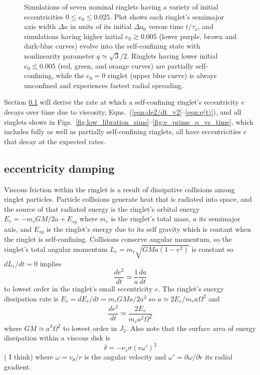\documentclass[preprint]{aastex62}
\begin{document}
\begin{figure}
    \caption{
        \label{fig:e0}
        Simulations of seven nominal ringlets having a variety of initial eccentricities $0\le e_0\le 0.025$.
        Plot shows each ringlet's semimajor axis width $\Delta a$ in units of its initial $\Delta a_0$
        versus time $t/\tau_\nu$, and simulations having higher initial $e_0\gtrsim0.005$ 
        (lower purple, brown and dark-blue curves) evolve into the self-confining state
        with nonlinearity parameter $q\simeq\sqrt{3}/2$. Ringlets having lower initial $e_0\lesssim0.005$
        (red, green, and orange curves) are partially self-confining, while the $e_0=0$ ringlet (upper blue curve)
        is always unconfined and experiences fastest radial spreading.
    }
\end{figure}

Section \ref{subsec:eccentricity} will derive the rate at which
a self-confining ringlet's eccentricity $e$ decays over time due to viscosity, Eqns.\ (\ref{eqn:de2/dt_v2}--\ref{eqn:e(t)}),
and all ringlets shows in Figs.\ \ref{fig:low_libration_sims}--\ref{fig:e_prime_q_vs_time},
which includes fully as well as partially self-confining ringlets, all have eccentricities $e$
that decay at the expected rates.


\subsection{eccentricity damping}
\label{subsec:eccentricity}

Viscous friction within the ringlet is a result of dissipative collisions among ringlet particles.
Particle collisions generate heat that is radiated into space, and the source of that radiated energy
is the ringlet's orbital energy $E_r=-m_rGM/2a + E_{sg}$ where $m_r$ is the ringlet's total
mass, $a$ its semimajor axis, and $E_{sg}$ is the ringlet's energy due to its self gravity
which is contant when the ringlet is self-confining. 
Collisions conserve angular momentum, so the ringlet's total angular momentum
$L_r=m_r\sqrt{GMa(1-e^2)}$ is constant so $dL_r/dt=0$ implies
\begin{equation}
    \label{eqn:e2-dot}
    \frac{de^2}{dt} \simeq \frac{1}{a}\frac{da}{dt}
\end{equation}
to lowest order in the ringlet's small eccentricity $e$.
The ringlet's energy dissipation rate is $\dot{E}_r = dE_r/dt=m_rGM\dot{a}/2a^2$ so
$\dot{a}\simeq2\dot{E_r}/m_ra\Omega^2$ and 
\begin{equation}
    \label{eqn:de2/dt}
    \frac{de^2}{dt} \simeq \frac{2\dot{E_r}}{m_r a^2\Omega^2}
\end{equation}
where $GM\simeq a^3\Omega^2$ to lowest order in $J_2$. Also note that
the surface area of energy dissipation within a viscous disk is
\begin{equation}
    \delta = -\nu_s\sigma(r\omega')^2
\end{equation}
(\citealt{P81} I think) where $\omega=v_\theta/r$ is the angular velocity and 
$\omega'=\partial\omega/\partial r$ its radial gradient.
\end{document}
